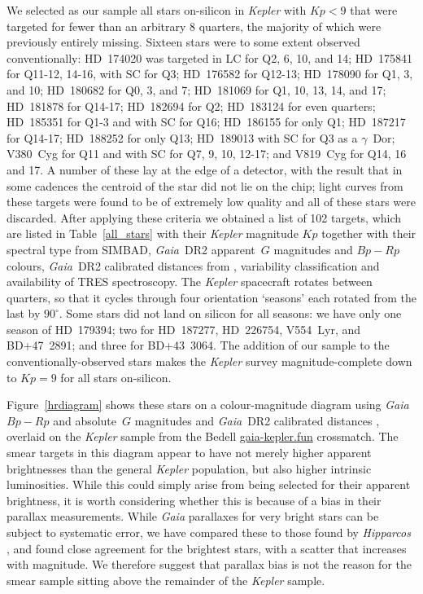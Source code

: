 \documentclass[a4paper,fleqn,usenatbib]{mnras}
\newcommand{\kepler}{\emph{Kepler}\xspace}
\newcommand{\gaia}{\emph{Gaia}\xspace}
\begin{document}
We selected as our sample all stars on-silicon in \kepler with $Kp<9$ that were targeted for fewer than an arbitrary $8$ quarters, the majority of which were previously entirely missing. Sixteen stars were to some extent observed conventionally: HD~174020 was targeted in LC for Q2, 6, 10, and 14; HD~175841 for Q11-12, 14-16, with SC for Q3; HD~176582 for Q12-13; HD~178090 for Q1, 3, and 10; HD~180682 for Q0, 3, and 7; HD~181069 for Q1, 10, 13, 14, and 17; HD~181878 for Q14-17; HD~182694 for Q2; HD~183124 for even quarters; HD~185351 for Q1-3 and with SC for Q16; HD~186155 for only Q1; HD~187217 for Q14-17; HD~188252 for only Q13; HD~189013 with SC for Q3 as a $\gamma$~Dor; V380~Cyg for Q11 and with SC for Q7, 9, 10, 12-17; and V819~Cyg for Q14, 16 and 17. A number of these lay at the edge of a detector, with the result that in some cadences the centroid of the star did not lie on the chip; light curves from these targets were found to be of extremely low quality and all of these stars were discarded. After applying these criteria we obtained a list of 102 targets, which are listed in Table~\ref{all_stars} with their \kepler magnitude $Kp$ together with their spectral type from SIMBAD, \gaia~DR2 apparent~$G$ magnitudes and $Bp-Rp$ colours, \gaia~DR2 calibrated distances from \citet{gaiadists}, variability classification and availability of TRES spectroscopy. The \kepler spacecraft rotates between quarters, so that it cycles through four orientation `seasons' each rotated from the last by $90^{\circ}$. Some stars did not land on silicon for all seasons: we have only one season of HD~179394; two for HD~187277, HD~226754, V554~Lyr, and BD+47~2891; and three for BD+43~3064. The addition of our sample to the conventionally-observed stars makes the \kepler survey magnitude-complete down to $Kp=9$ for all stars on-silicon.

Figure~\ref{hrdiagram} shows these stars on a colour-magnitude diagram using \gaia $Bp-Rp$ and absolute~$G$ magnitudes and \gaia~DR2 calibrated distances \citep{gaiadists}, overlaid on the \kepler sample from the Bedell \url{gaia-kepler.fun} crossmatch. The smear targets in this diagram appear to have not merely higher apparent brightnesses than the general \kepler population, but also higher intrinsic luminosities. While this could simply arise from being selected for their apparent brightness, it is {}worth considering whether this is because of a bias in their parallax measurements. While \gaia parallaxes for very bright stars can be subject to systematic error, we have compared these to those found by \emph{Hipparcos} \citep{vanleeuwen07b}, and found close agreement for the brightest stars, with a scatter that increases with magnitude. We therefore suggest that parallax bias is not the reason for the smear sample sitting above the remainder of the \kepler sample.
\end{document}
